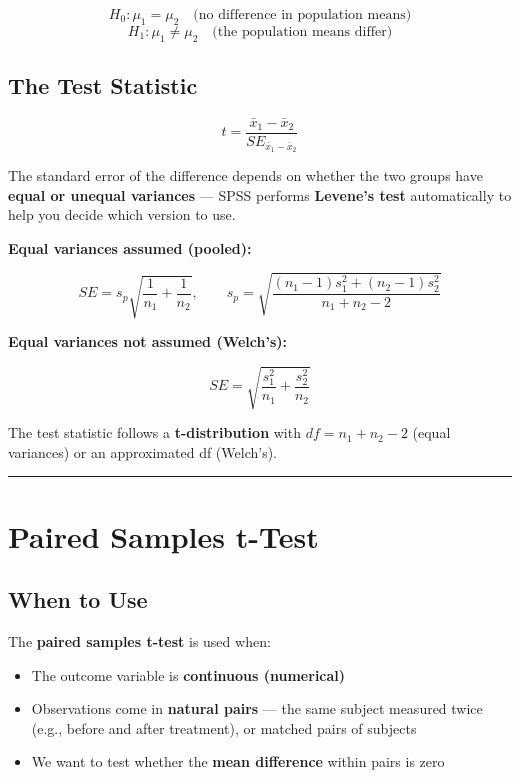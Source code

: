 \documentclass[
  12pt,
  letterpaper,
]{book}
\providecommand{\tightlist}{%
  \setlength{\itemsep}{0pt}\setlength{\parskip}{0pt}}
\begin{document}
\[H_0: \mu_1 = \mu_2 \quad \text{(no difference in population means)}\]
\[H_1: \mu_1 \neq \mu_2 \quad \text{(the population means differ)}\]

\subsection{The Test Statistic}\label{the-test-statistic-1}

\[t = \frac{\bar{x}_1 - \bar{x}_2}{SE_{\bar{x}_1 - \bar{x}_2}}\]

The standard error of the difference depends on whether the two groups
have \textbf{equal or unequal variances} --- SPSS performs
\textbf{Levene's test} automatically to help you decide which version to
use.

\textbf{Equal variances assumed (pooled):}

\[SE = s_p\sqrt{\frac{1}{n_1}+\frac{1}{n_2}}, \qquad
s_p = \sqrt{\frac{(n_1-1)s_1^2 + (n_2-1)s_2^2}{n_1+n_2-2}}\]

\textbf{Equal variances not assumed (Welch's):}

\[SE = \sqrt{\frac{s_1^2}{n_1}+\frac{s_2^2}{n_2}}\]

The test statistic follows a \textbf{t-distribution} with
\(df = n_1 + n_2 - 2\) (equal variances) or an approximated df
(Welch's).

\begin{center}\rule{0.5\linewidth}{0.5pt}\end{center}

\section{Paired Samples t-Test}\label{paired-samples-t-test}

\subsection{When to Use}\label{when-to-use-3}

The \textbf{paired samples t-test} is used when:

\begin{itemize}
\tightlist
\item
  The outcome variable is \textbf{continuous (numerical)}
\item
  Observations come in \textbf{natural pairs} --- the same subject
  measured twice (e.g., before and after treatment), or matched pairs of
  subjects
\item
  We want to test whether the \textbf{mean difference} within pairs is
  zero
\end{itemize}
\end{document}
